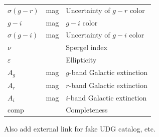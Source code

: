 \documentclass[twocolumn,astrosymb,twocolappendix]{aastex631}
\begin{document}
\begin{CJK*}{UTF8}{gbsn}
\begin{table}
\begin{center}
\begin{tabular}{l l l}
$\sigma(g-r)$           & mag     & Uncertainty of $g-r$ color      \\
$g-i$                    & mag     & $g-i$ color                     \\
$\sigma(g-i)$           & mag     & Uncertainty of $g-i$ color      \\
$\nu$                    &         & Spergel index              \\
$\varepsilon$               &         & Ellipticity                     \\
$A_g$                    & mag     & $g$-band Galactic extinction \\
$A_r$                    & mag     & $r$-band Galactic extinction \\
$A_i$                    & mag     & $i$-band Galactic extinction \\
comp & & Completeness \\
\hline\hline
\end{tabular}
\end{center}
\end{table}

Also add external link for fake UDG catalog, etc. 


\end{CJK*}
\end{document}
